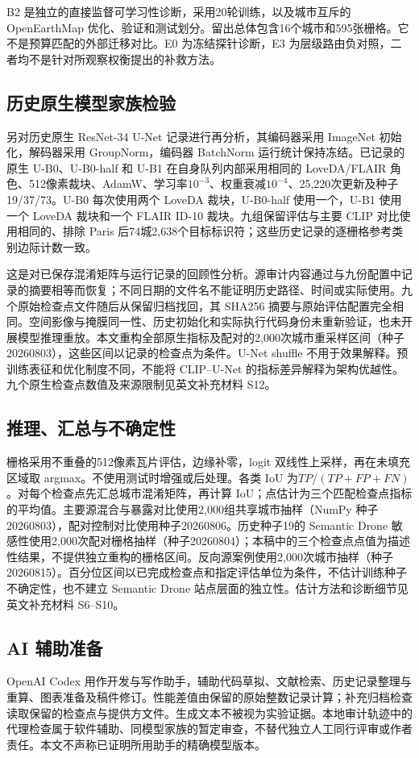 B2 是独立的直接监督可学习性诊断，采用20轮训练，以及城市互斥的 OpenEarthMap 优化、验证和测试划分。留出总体包含16个城市和595张栅格。它不是预算匹配的外部迁移对比。E0 为冻结探针诊断，E3 为层级路由负对照，二者均不是针对所观察权衡提出的补救方法。

\subsection{历史原生模型家族检验}
\label{sec:unet_protocol}
另对历史原生 ResNet-34 U-Net 记录进行再分析，其编码器采用 ImageNet 初始化，解码器采用 GroupNorm，编码器 BatchNorm 运行统计保持冻结。已记录的原生 U-B0、U-B0-half 和 U-B1 在自身队列内部采用相同的 LoveDA/FLAIR 角色、512像素裁块、AdamW、学习率$10^{-3}$、权重衰减$10^{-4}$、25,220次更新及种子19/37/73。U-B0 每次使用两个 LoveDA 裁块，U-B0-half 使用一个，U-B1 使用一个 LoveDA 裁块和一个 FLAIR ID-10 裁块。九组保留评估与主要 CLIP 对比使用相同的、排除 Paris 后74城2,638个目标标识符；这些历史记录的逐栅格参考类别边际计数一致。

这是对已保存混淆矩阵与运行记录的回顾性分析。源审计内容通过与九份配置中记录的摘要相等而恢复；不同日期的文件名不能证明历史路径、时间或实际使用。九个原始检查点文件随后从保留归档找回，其 SHA256 摘要与原始评估配置完全相同。空间影像与掩膜同一性、历史初始化和实际执行代码身份未重新验证，也未开展模型推理重放。本文重构全部原生指标及配对的2,000次城市重采样区间（种子20260803），这些区间以记录的检查点为条件。U-Net shuffle 不用于效果解释。预训练表征和优化制度不同，不能将 CLIP--U-Net 的指标差异解释为架构优越性。九个原生检查点数值及来源限制见英文补充材料 S12。

\subsection{推理、汇总与不确定性}
\label{sec:contrasts}
栅格采用不重叠的512像素瓦片评估，边缘补零，logit 双线性上采样，再在未填充区域取 argmax。不使用测试时增强或后处理。各类 IoU 为\(TP/(TP+FP+FN)\)。对每个检查点先汇总城市混淆矩阵，再计算 IoU；点估计为三个匹配检查点指标的平均值。主要源混合与暴露对比使用2,000组共享城市抽样（NumPy 种子20260803），配对控制对比使用种子20260806。历史种子19的 Semantic Drone 敏感性使用2,000次配对栅格抽样（种子20260804）；本稿中的三个检查点点值为描述性结果，不提供独立重构的栅格区间。反向源案例使用2,000次城市抽样（种子20260815）。百分位区间以已完成检查点和指定评估单位为条件，不估计训练种子不确定性，也不建立 Semantic Drone 站点层面的独立性。估计方法和诊断细节见英文补充材料 S6--S10。

\subsection{AI 辅助准备}
\label{sec:ai_assistance}
OpenAI Codex 用作开发与写作助手，辅助代码草拟、文献检索、历史记录整理与重算、图表准备及稿件修订。性能差值由保留的原始整数记录计算；补充归档检查读取保留的检查点与提供方文件。生成文本不被视为实验证据。本地审计轨迹中的代理检查属于软件辅助、同模型家族的暂定审查，不替代独立人工同行评审或作者责任。本文不声称已证明所用助手的精确模型版本。
